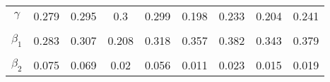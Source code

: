 \begin{footnotesize}
\begin{singlespace}
\begin{tabular}{ccccccccc}
$\gamma$ & 0.279 & 0.295 & 0.3 & 0.299 & 0.198 & 0.233 & 0.204 & 0.241 \\ 
 & \begin{tiny} [0.274,0.286] \end{tiny}  & \begin{tiny} [0.29,0.301] \end{tiny}  & \begin{tiny} [0.295,0.305] \end{tiny}  & \begin{tiny} [0.294,0.304] \end{tiny}  & \begin{tiny} [0.191,0.204] \end{tiny}  & \begin{tiny} [0.228,0.239] \end{tiny}  & \begin{tiny} [0.198,0.21] \end{tiny}  & \begin{tiny} [0.236,0.247] \end{tiny}  \\ 
$ \beta_{1} $ & 0.283 & 0.307 & 0.208 & 0.318 & 0.357 & 0.382 & 0.343 & 0.379 \\ 
 & \begin{tiny} [0.161,0.414] \end{tiny}  & \begin{tiny} [0.171,0.441] \end{tiny}  & \begin{tiny} [0.121,0.297] \end{tiny}  & \begin{tiny} [0.183,0.45] \end{tiny}  & \begin{tiny} [0.284,0.432] \end{tiny}  & \begin{tiny} [0.303,0.463] \end{tiny}  & \begin{tiny} [0.271,0.414] \end{tiny}  & \begin{tiny} [0.299,0.459] \end{tiny}  \\ 
$ \beta_{2} $ & 0.075 & 0.069 & 0.02 & 0.056 & 0.011 & 0.023 & 0.015 & 0.019 \\ 

\end{tabular}
\end{singlespace}
\end{footnotesize}
